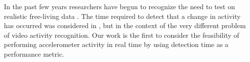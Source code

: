 In the past few years researchers have begun to recognize the need to test on
realistic free-living data \cite{gu09} \cite{kwapitz10} \cite{strohrmann11}
\cite{wu09}. The time required to detect that a change in activity has occurred
was considered in \cite{grauman12} \cite{song06}, but in the context of
the very different problem of video activity recognition. Our work is the
first to consider the feasibility of performing accelerometer activity in real
time by using detection time as a performance metric.
